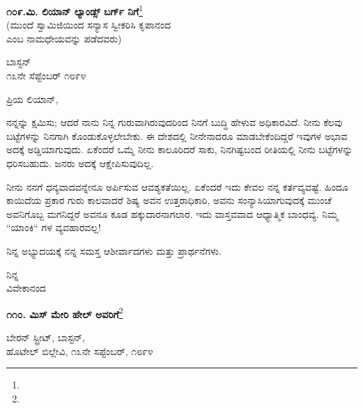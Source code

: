 \newpage

\begin{center}
\textbf{೧೦೯.ಮಿ. ಲಿಯಾನ್ ಲ್ಯಾಂಡ್ಸ್ ಬರ್ಗ್ ನಿಗೆ}\footnote{}\\ (ಮುಂದೆ ಸ್ವಾಮಿಜಿಯಿಂದ ಸನ್ಯಾಸ ಸ್ವೀಕರಿಸಿ ಕೃಪಾನಂದ\\ ಎಂಬ ನಾಮಧೇಯವನ್ನು ಪಡೆದವರು)
\end{center}

\vspace{-0.5cm}

\begin{flushright}
ಬಾಸ್ಟನ್\\೧೩ನೇ ಸೆಪ್ಟೆಂಬರ್ ೧೮೯೪
\end{flushright}

\vspace{-0.5cm}

\noindent
ಪ್ರಿಯ ಲಿಯಾನ್,

ನನ್ನನ್ನು ಕ್ಷಮಿಸು; ಆದರೆ ನಾನು ನಿನ್ನ ಗುರುವಾಗಿರುವುದರಿಂದ ನಿನಗೆ ಬುದ್ಧಿ ಹೇಳುವ ಅಧಿಕಾರವಿದೆ. ನೀನು ಕೆಲವು ಬಟ್ಟೆಗಳನ್ನು ನಿನಗಾಗಿ ಕೊಂಡುಕೊಳ್ಳಲೇಬೇಕು. ಈ ದೇಶದಲ್ಲಿ ನೀನೇನಾದರೂ ಮಾಡಬೇಕೆಂದಿದ್ದರೆ ಇವುಗಳ ಅಭಾವ ಅದಕ್ಕೆ ಅಡ್ಡಿಯಾಗುವುದು. ಏಕೆಂದರೆ ಒಮ್ಮೆ ನೀನು ಕಾಲೂರಿದರೆ ಸಾಕು, ನಿನಗಿಷ್ಟಬಂದ ರೀತಿಯಲ್ಲಿ ನೀನು ಬಟ್ಟೆಗಳನ್ನು ಧರಿಸಬಹುದು. ಜನರು ಅದಕ್ಕೆ ಆಕ್ಷೇಪಿಸುವುದಿಲ್ಲ.

ನೀನು ನನಗೆ ಧನ್ಯವಾದವನ್ನೇನೂ ಅರ್ಪಿಸುವ ಆವಶ್ಯಕತೆಯಿಲ್ಲ. ಏಕೆಂದರೆ ಇದು ಕೇವಲ ನನ್ನ ಕರ್ತವ್ಯವಷ್ಟೆ. ಹಿಂದೂ ಕಾಯಿದೆಯ ಪ್ರಕಾರ ಗುರು ಕಾಲವಾದರೆ ಶಿಷ್ಯ ಅವನ ಉತ್ತರಾಧಿಕಾರಿ, ಅವನು ಸಂನ್ಯಾಸಿಯಾಗುವುದಕ್ಕೆ ಮುಂಚೆ ಅವನಿಗೊಬ್ಬ ಮಗನಿದ್ದರೆ ಅವನೂ ಕೂಡ ಹಕ್ಕುದಾರನಾಗಲಾರ. ಇದು ವಾಸ್ತವವಾದ ಆಧ್ಯಾತ್ಮಿಕ ಬಾಂಧವ್ಯ. ನಿಮ್ಮ “ಯಾಂಕಿ“ ಗಳ ವ್ಯವಹಾರವಲ್ಲ!

ನಿನ್ನ ಅಭ್ಯುದಯಕ್ಕೆ ನನ್ನ ಸಮಸ್ತ ಆಶೀರ್ವಾದಗಳು ಮತ್ತು ಪ್ರಾರ್ಥನೆಗಳು.

\vspace{-0.5cm}

{\flushright
ನಿನ್ನ\\ವಿವೇಕಾನಂದ\par}

\begin{center}
\textbf{೧೧೦. ಮಿಸ್ ಮೇರಿ ಹೇಲ್‌ ಅವರಿಗೆ}\footnote{}
\end{center}

\vspace{-0.5cm}

\begin{flushright}
ಬೇರನ್ ಸ್ಟ್ರೀಟ್, ಬಾಸ್ಟನ್,\\ಹೊಟೇಲ್ ಬಿಲ್ಲೇವಿ, ೧೩ನೇ ಸಪ್ಟೆಂಬರ್, ೧೮೯೪
\end{flushright}

\vspace{-0.5cm}


